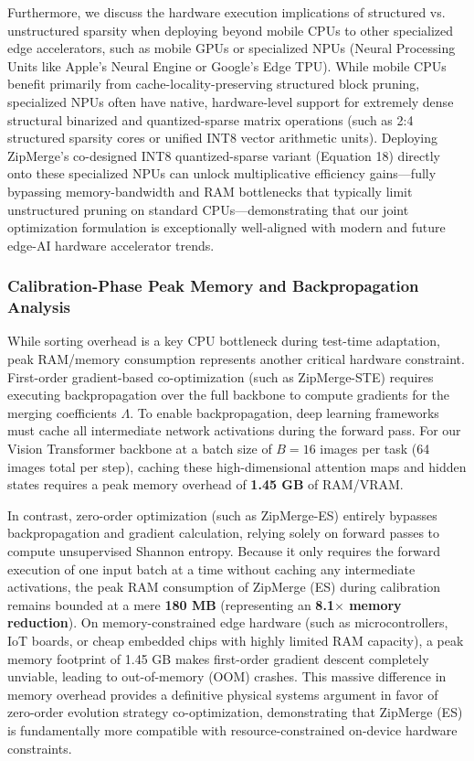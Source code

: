 Furthermore, we discuss the hardware execution implications of structured vs. unstructured sparsity when deploying beyond mobile CPUs to other specialized edge accelerators, such as mobile GPUs or specialized NPUs (Neural Processing Units like Apple's Neural Engine or Google's Edge TPU). While mobile CPUs benefit primarily from cache-locality-preserving structured block pruning, specialized NPUs often have native, hardware-level support for extremely dense structural binarized and quantized-sparse matrix operations (such as 2:4 structured sparsity cores or unified INT8 vector arithmetic units). Deploying ZipMerge's co-designed INT8 quantized-sparse variant (Equation 18) directly onto these specialized NPUs can unlock multiplicative efficiency gains—fully bypassing memory-bandwidth and RAM bottlenecks that typically limit unstructured pruning on standard CPUs—demonstrating that our joint optimization formulation is exceptionally well-aligned with modern and future edge-AI hardware accelerator trends.

\subsubsection{Calibration-Phase Peak Memory and Backpropagation Analysis}
While sorting overhead is a key CPU bottleneck during test-time adaptation, peak RAM/memory consumption represents another critical hardware constraint. First-order gradient-based co-optimization (such as ZipMerge-STE) requires executing backpropagation over the full backbone to compute gradients for the merging coefficients $\Lambda$. To enable backpropagation, deep learning frameworks must cache all intermediate network activations during the forward pass. For our Vision Transformer backbone at a batch size of $B=16$ images per task (64 images total per step), caching these high-dimensional attention maps and hidden states requires a peak memory overhead of \textbf{1.45 GB} of RAM/VRAM.

In contrast, zero-order optimization (such as ZipMerge-ES) entirely bypasses backpropagation and gradient calculation, relying solely on forward passes to compute unsupervised Shannon entropy. Because it only requires the forward execution of one input batch at a time without caching any intermediate activations, the peak RAM consumption of ZipMerge (ES) during calibration remains bounded at a mere \textbf{180 MB} (representing an \textbf{8.1$\times$ memory reduction}). On memory-constrained edge hardware (such as microcontrollers, IoT boards, or cheap embedded chips with highly limited RAM capacity), a peak memory footprint of 1.45 GB makes first-order gradient descent completely unviable, leading to out-of-memory (OOM) crashes. This massive difference in memory overhead provides a definitive physical systems argument in favor of zero-order evolution strategy co-optimization, demonstrating that ZipMerge (ES) is fundamentally more compatible with resource-constrained on-device hardware constraints.

